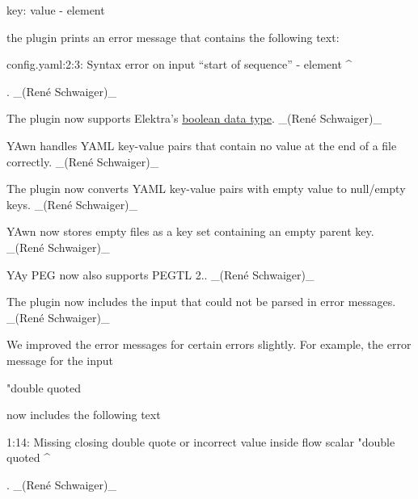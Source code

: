 \begin{DoxyCode}
key: value
  - element
\end{DoxyCode}


the plugin prints an error message that contains the following text\+:


\begin{DoxyCode}
config.yaml:2:3: Syntax error on input “start of sequence”
                   - element
                   ^
\end{DoxyCode}


. \+\_\+(René Schwaiger)\+\_\+


\begin{DoxyItemize}
\item The plugin now supports Elektra’s \hyperlink{doc_decisions_boolean_md}{boolean data type}. \+\_\+(René Schwaiger)\+\_\+
\item Y\+Awn handles Y\+A\+ML key-\/value pairs that contain no value at the end of a file correctly. \+\_\+(René Schwaiger)\+\_\+
\item The plugin now converts Y\+A\+ML key-\/value pairs with empty value to null/empty keys. \+\_\+(René Schwaiger)\+\_\+
\item Y\+Awn now stores empty files as a key set containing an empty parent key. \+\_\+(René Schwaiger)\+\_\+
\end{DoxyItemize}


\begin{DoxyItemize}
\item Y\+Ay P\+EG now also supports P\+E\+G\+TL 2.. \+\_\+(René Schwaiger)\+\_\+
\item The plugin now includes the input that could not be parsed in error messages. \+\_\+(René Schwaiger)\+\_\+
\item We improved the error messages for certain errors slightly. For example, the error message for the input
\end{DoxyItemize}


\begin{DoxyCode}
"double quoted
\end{DoxyCode}


now includes the following text


\begin{DoxyCode}
1:14: Missing closing double quote or incorrect value inside flow scalar
      "double quoted
                    ^
\end{DoxyCode}


. \+\_\+(René Schwaiger)\+\_\+


